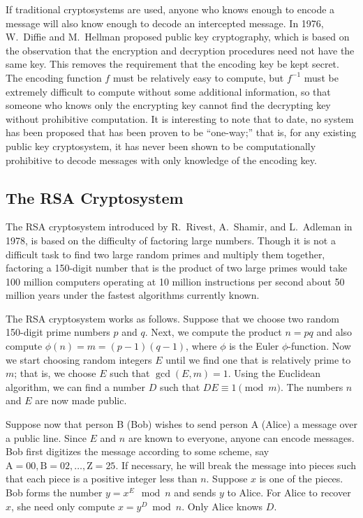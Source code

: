  
 
If traditional cryptosystems are used, anyone who knows enough to
encode a message will also know enough to decode an intercepted
message. In 1976, W.~Diffie and
M.~Hellman proposed public key cryptography, which
is based on the observation that the encryption and decryption
procedures need not have the same key. This removes the requirement
that the encoding key be kept secret. The encoding function $f$ must
be relatively easy to compute, but $f^{-1}$ must be extremely
difficult to compute without some additional information, so that
someone who knows only the encrypting key cannot find the decrypting
key without prohibitive computation. It is interesting to note that to
date, no system has been proposed that has been proven to be
``one-way;'' that is, for any existing public key cryptosystem, it has
never been shown to be computationally prohibitive to decode messages
with only knowledge of the encoding key. 
 
 
 
\subsection*{The RSA Cryptosystem}
 
The RSA cryptosystem introduced by R.~Rivest,
A.~Shamir, and L.~Adleman in
1978, is based on the difficulty of factoring large numbers. Though it
is not a difficult task to find two large random primes and multiply
them together, factoring a 150-digit number that is the product of two
large primes would take 100 million computers operating at 10 million
instructions per second about 50 million years under the fastest
algorithms currently known.
 
 
The RSA cryptosystem
works as follows. Suppose that we choose two random 150-digit prime
numbers $p$ and $q$. Next, we compute the product $n= pq$ and also
compute $\phi(n) = m = (p - 1)(q-1)$, where $\phi$ is the Euler
$\phi$-function.  Now we start choosing random integers $E$ until we
find one that is relatively prime to $m$; that is, we choose $E$ such
that $\gcd(E, m) = 1$. Using the Euclidean algorithm, we can find a
number $D$ such that \mbox{$DE \equiv 1 \pmod{m}$}. The numbers $n$ and $E$
are now made public. 
 
 
Suppose now that person B (Bob) wishes to send person A (Alice) a
message over a public line. Since $E$ and $n$ are known to everyone,
anyone can encode messages. Bob first digitizes the message according
to some scheme, say $\mbox{A}  = 00, \mbox{B}  = 02, \ldots, \mbox{Z}=
25$. If necessary, he will break the message into pieces such that
each piece is a positive integer less than $n$.  Suppose $x$ is one of
the pieces.  Bob forms the number $y = x^E \mod n$ and sends $y$ to
Alice. For Alice to recover $x$, she need only compute $x = y^D \bmod
n$. Only Alice knows $D$.  
 
